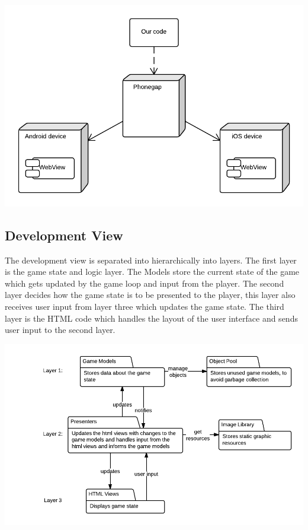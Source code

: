 \includegraphics[width=\textwidth]{pictures/deployment_diagram}

\subsection*{Development View}

	The development view is separated into hierarchically into layers. The first layer is the game state 
	and logic layer. The Models store the current state of the game which gets updated by the game loop 
	and input from the player. The second layer decides how the game state is to be presented to the 
	player, this layer also receives user input from layer three which updates the game state. The third 
	layer is the HTML code which handles the layout of the user interface and sends user input to the
	second layer.

	\includegraphics[width=\textwidth]{pictures/development_view}
